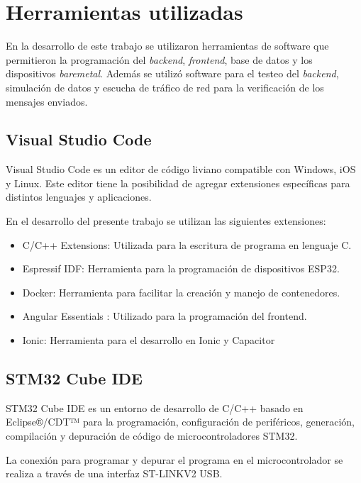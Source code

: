 \section{Herramientas utilizadas}

En la desarrollo de este trabajo se utilizaron herramientas de software que permitieron la programación del \textit{backend}, \textit{frontend}, base de datos y los dispositivos \textit{baremetal}. Además se utilizó software para el testeo del \textit{backend}, simulación de datos y escucha de tráfico de red para la verificación de los mensajes enviados.

\subsection{Visual Studio Code}
Visual Studio Code es un editor de código liviano compatible con Windows, iOS y Linux. Este editor tiene la posibilidad de agregar extensiones específicas para distintos lenguajes y aplicaciones\citep{vscode}.

En el desarrollo del presente trabajo se utilizan las siguientes extensiones:

\begin{itemize}
	\item C/C++ Extensions: Utilizada para la escritura de programa en lenguaje C.
	\item Espressif IDF: Herramienta para la programación de dispositivos ESP32.
	\item Docker: Herramienta para facilitar la creación y manejo de contenedores.
	\item Angular Essentials : Utilizado para la programación del frontend.
	\item Ionic:  Herramienta para el desarrollo en Ionic y Capacitor
\end{itemize}

\subsection{STM32 Cube IDE}
STM32 Cube IDE es un entorno de desarrollo de C/C++ basado en Eclipse®/CDT™ para la programación, configuración de periféricos, generación, compilación y depuración de código de microcontroladores STM32\citep{stcode}.

La conexión para programar y depurar el programa en el microcontrolador se realiza a través de una interfaz ST-LINKV2 USB.

